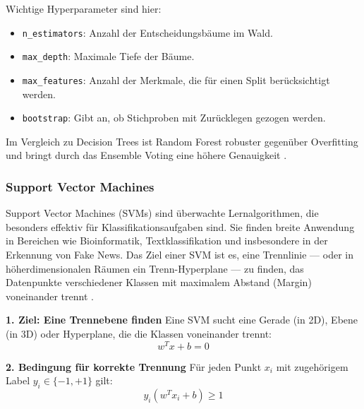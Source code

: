 Wichtige Hyperparameter sind hier:
\begin{itemize}
    \item \texttt{n\_estimators}: Anzahl der Entscheidungsbäume im Wald.
    \item \texttt{max\_depth}: Maximale Tiefe der Bäume.
    \item \texttt{max\_features}: Anzahl der Merkmale, die für einen Split berücksichtigt werden.
    \item \texttt{bootstrap}: Gibt an, ob Stichproben mit Zurücklegen gezogen werden.
\end{itemize}

Im Vergleich zu Decision Trees ist Random Forest robuster gegenüber Overfitting und bringt durch das Ensemble Voting eine 
höhere Genauigkeit \cite{al-tarawneh2025}.

\subsubsection{Support Vector Machines}

Support Vector Machines (SVMs) sind überwachte Lernalgorithmen, die besonders effektiv für Klassifikationsaufgaben sind. 
Sie finden breite Anwendung in Bereichen wie Bioinformatik, Textklassifikation und 
insbesondere in der Erkennung von Fake News. 
Das Ziel einer SVM ist es, eine Trennlinie --- oder in höherdimensionalen Räumen ein Trenn-Hyperplane --- zu finden, 
das Datenpunkte verschiedener Klassen mit maximalem Abstand (Margin) voneinander trennt  \cite{Noble:2006aa, Buddhadev2025, sabir2025, jakkula2006tutorial}.

\textbf{1. Ziel: Eine Trennebene finden}
Eine SVM sucht eine Gerade (in 2D), Ebene (in 3D) oder Hyperplane, die die Klassen voneinander trennt:
\begin{equation}
w^T x + b = 0
\end{equation}

\textbf{2. Bedingung für korrekte Trennung}
Für jeden Punkt \( x_i \) mit zugehörigem Label \( y_i \in \{-1, +1\} \) gilt:
\begin{equation}
y_i(w^T x_i + b) \geq 1
\end{equation}

